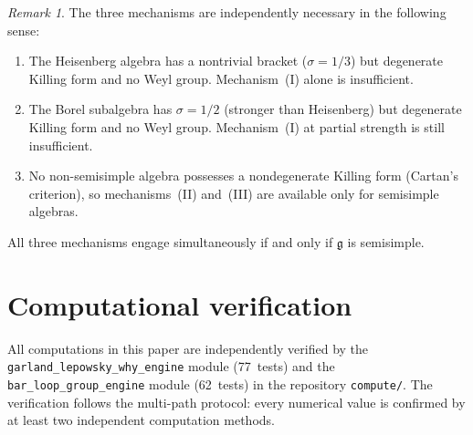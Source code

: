 \documentclass[11pt,reqno]{amsart}
\theoremstyle{plain}
\theoremstyle{definition}
\theoremstyle{remark}
\newtheorem{remark}[theorem]{Remark}
\newcommand{\fg}{\mathfrak{g}}
\begin{document}
\begin{remark}\label{rem:three-necessary}
 The three mechanisms are independently necessary in the following sense:
 \begin{enumerate}[label=(\alph*)]
 \item The Heisenberg algebra has a nontrivial bracket ($\sigma = 1/3$)
 but degenerate Killing form and no Weyl group. Mechanism~(I) alone is
 insufficient.
 \item The Borel subalgebra has $\sigma = 1/2$ (stronger than Heisenberg)
 but degenerate Killing form and no Weyl group. Mechanism~(I) at
 partial strength is still insufficient.
 \item No non-semisimple algebra possesses a nondegenerate Killing form
 (Cartan's criterion), so mechanisms~(II) and~(III) are available only
 for semisimple algebras.
 \end{enumerate}
 All three mechanisms engage simultaneously if and only if $\fg$ is
 semisimple.
\end{remark}


\section{Computational verification}
\label{sec:verification}

All computations in this paper are independently verified by the
\texttt{garland\_lepowsky\_why\_engine} module (77~tests) and the
\texttt{bar\_loop\_group\_engine} module (62~tests) in the repository
\texttt{compute/}. The verification follows the multi-path protocol:
every numerical value is confirmed by at least two independent computation
methods.
\end{document}
